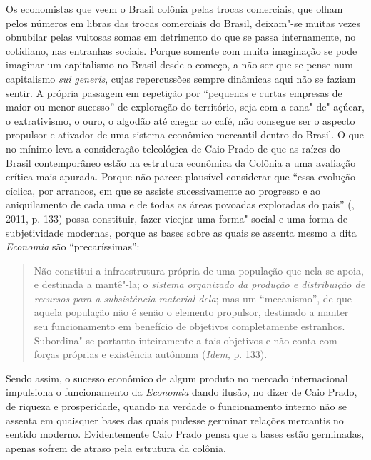 Os economistas que veem o Brasil colônia pelas trocas comerciais, que
olham pelos números em libras das trocas comerciais do Brasil, deixam"-se
muitas vezes obnubilar pelas vultosas somas em detrimento do que se
passa internamente, no cotidiano, nas entranhas sociais. Porque somente
com muita imaginação se pode imaginar um capitalismo no Brasil desde o
começo, a não ser que se pense num capitalismo \emph{sui}
\emph{generis}, cujas repercussões sempre dinâmicas aqui não se faziam
sentir. A própria passagem em repetição por ``pequenas e curtas empresas
de maior ou menor sucesso'' de exploração do território, seja com a
cana"-de"-açúcar, o extrativismo, o ouro, o algodão até chegar ao café,
não consegue ser o aspecto propulsor e ativador de uma sistema econômico
mercantil dentro do Brasil. O que no mínimo leva a consideração
teleológica de Caio Prado de que as raízes do Brasil contemporâneo estão
na estrutura econômica da Colônia a uma avaliação crítica mais apurada.
Porque não parece plausível considerar que ``essa evolução cíclica, por
arrancos, em que se assiste sucessivamente ao progresso e ao
aniquilamento de cada uma e de todas as áreas povoadas exploradas do
país'' (, 2011, p. 133) possa constituir, fazer vicejar uma
forma"-social e uma forma de subjetividade modernas, porque as bases
sobre as quais se assenta mesmo a dita \emph{Economia} são
``precaríssimas'':

\begin{quote}
Não constitui a infraestrutura própria de uma população que nela se
apoia, e destinada a mantê"-la; o \emph{sistema organizado da produção e
distribuição de recursos para a subsistência material dela}; mas um
``mecanismo'', de que aquela população não é senão o elemento propulsor,
destinado a manter seu funcionamento em benefício de objetivos
completamente estranhos. Subordina"-se portanto inteiramente a tais
objetivos e não conta com forças próprias e existência autônoma
(\emph{Idem}, p. 133).
\end{quote}

Sendo assim, o sucesso econômico de algum produto no mercado
internacional impulsiona o funcionamento da \emph{Economia} dando
ilusão, no dizer de Caio Prado, de riqueza e prosperidade, quando na
verdade o funcionamento interno não se assenta em quaisquer bases das
quais pudesse germinar relações mercantis no sentido moderno.
Evidentemente Caio Prado pensa que a bases estão
germinadas, apenas sofrem de atraso pela estrutura da colônia.

